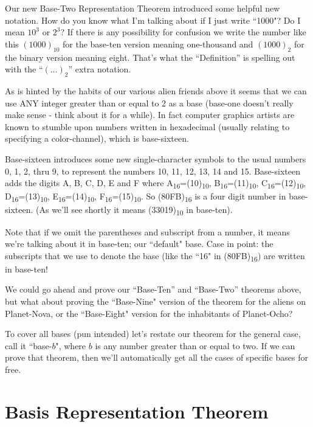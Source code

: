 \documentclass{article}
\begin{document}
Our new Base-Two Representation Theorem introduced some helpful new notation.
How do you know what I'm talking about if I just
write ``1000"? Do I mean $10^3$ or $2^3$?
If there is any possibility for confusion we write
the number like this $(1000)_{10}$ 
for the base-ten version meaning one-thousand and $(1000)_2$
for the binary version meaning eight.  That's what the ``Definition'' is spelling out with the ``$(\dots)_2$'' extra notation.

As is hinted by the habits of our various alien friends
above it seems that we can use ANY integer greater than
or equal to 2 as a base (base-one doesn't really make
sense - think about it for a while).
In fact computer graphics artists are known
to stumble upon numbers written in hexadecimal (usually relating to specifying a color-channel),
which is base-sixteen.

Base-sixteen introduces some new single-character symbols to the usual numbers 0, 1,
2, thru 9,
to represent the numbers 10, 11, 12, 13, 14 and 15.
Base-sixteen adds the digits A, B, C, D, E and F where
A\textsubscript{16}=(10)\textsubscript{10},
B\textsubscript{16}=(11)\textsubscript{10},
C\textsubscript{16}=(12)\textsubscript{10},
D\textsubscript{16}=(13)\textsubscript{10},
E\textsubscript{16}=(14)\textsubscript{10},
F\textsubscript{16}=(15)\textsubscript{10}.
So (80FB)\textsubscript{16} is a four digit number in base-sixteen. (As we'll see shortly it means (33019)\textsubscript{10} in base-ten).

Note that if we omit the parentheses and subscript from a number,
it means we're talking about it in base-ten; our ``default" base.
Case in point: the subscripts that we use to denote the base
(like the ``16" in (80FB)\textsubscript{16}) are written in base-ten!

We could go ahead and prove our ``Base-Ten'' and ``Base-Two'' theorems above,
but what about proving the ``Base-Nine" version of the theorem for the aliens on Planet-Nova,
or the ``Base-Eight" version for the inhabitants of Planet-Ocho?

To cover all bases (pun intended) let's restate our theorem for the general case,
call it ``base-$b$",
where $b$ is any number greater than or equal to two.
If we can prove that theorem,
then we'll automatically get all the cases of specific bases for free.

\section*{Basis Representation Theorem}
\end{document}
